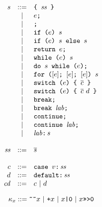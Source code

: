 \documentclass{article}
\newcommand{\seq}[1]{\overline{{#1}}}
\newcommand{\mathjs}[1]{\mbox{\texttt{{#1}}}}
\newcommand{\return}[1]{\mathjs{return }{#1}\mathjs{;}}
\newcommand{\while}[2]{\mathjs{while (}{#1}\mathjs{) }{#2}}
\newcommand{\dowhile}[2]{\mathjs{do }{#1}\mathjs{ while (}{#2}\mathjs{);}}
\newcommand{\for}[4]{\mathjs{for (}{#1}\mathjs{; }{#2}\mathjs{; }{#3}\mathjs{) }{#4}}
\newcommand{\switch}[2]{\mathjs{switch (}{#1}\mathjs{) \char123{} }{#2}\mathjs{ \char125{}}}
\newcommand{\brk}{\mathjs{break;}}
\newcommand{\brkl}[1]{\mathjs{break }{#1}\mathjs{;}}
\newcommand{\cont}{\mathjs{continue;}}
\newcommand{\contl}[1]{\mathjs{continue }{#1}\mathjs{;}}
\newcommand{\lab}[2]{{#1}\mathjs{:}\,{#2}}
\newcommand{\ifthen}[2]{\mathjs{if (}{#1}\mathjs{) }{#2}}
\newcommand{\ifthenelse}[3]{\mathjs{if (}{#1}\mathjs{) }{#2}\mathjs{ else }{#3}}
\newcommand{\block}[1]{\mathjs{\char123{} }{#1}\mathjs{ \char125{}}}
\newcommand{\toint}[1]{\mathjs{\~{}\~{}}{#1}}
\newcommand{\todouble}[1]{\mathjs{+}{#1}}
\begin{document}
\[
\begin{array}{rcl}
s & ::= & \block{\mathit{ss}} \\
  &  |  & e\mathjs{;} \\
  &  |  & \mathjs{;} \\
  &  |  & \ifthen{e}{s} \\
  &  |  & \ifthenelse{e}{s}{s} \\
  &  |  & \return{e} \\
  &  |  & \while{e}{s} \\
  &  |  & \dowhile{s}{e} \\
  &  |  & \for{[e]}{[e]}{[e]}{s} \\
  &  |  & \switch{e}{\seq{c}} \\
  &  |  & \switch{e}{\seq{c}\ d} \\
  &  |  & \brk \\
  &  |  & \brkl{\mathit{lab}} \\
  &  |  & \cont \\
  &  |  & \contl{\mathit{lab}} \\
  &  |  & \lab{\mathit{lab}}{s} \\
\\
\mathit{ss} & ::= & \seq{s} \\
\\
c & ::= & \mathjs{case }v\mathjs{:}\,\mathit{ss} \\
d & ::= & \mathjs{default:}\,\mathit{ss} \\
\mathit{cd} & ::= & c ~|~ d \\
\end{array}
\]

\[
\kappa_x ::= \toint{x} ~|~ \todouble{x} ~|~ x\mathjs{|0} ~|~ x\mathjs{>>>0} \\
\]
\end{document}
